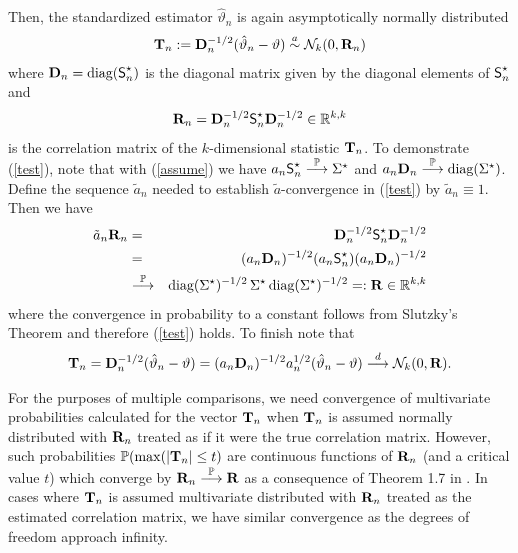 \documentclass[12pt,a4paper]{article}
\begin{document}
Then, the standardized estimator $\hat{\vartheta}_n$ is again asymptotically normally
distributed
\begin{eqnarray} \label{test}
\T_n := %
\D_n^{-1/2} (\hat{\vartheta}_n - \vartheta) \an \N_k(0, \Cor_n)
\end{eqnarray}
where $\mathbf{D}_n = \text{diag}(\textsf{S}^\star_n)$ is the diagonal matrix given by the diagonal elements of
$\textsf{S}^\star_n$ and 
\begin{eqnarray*}
\mathbf{R}_n = \mathbf{D}_n^{-1/2} \textsf{S}^\star_n \mathbf{D}_n^{-1/2} \in \mathbb{R}^{k,k} 
\end{eqnarray*}
is the correlation matrix of the $k$-dimensional statistic 
$\mathbf{T}_n$. 
To demonstrate (\ref{test}), note that 
with (\ref{assume}) we have $a_n \textsf{S}^\star_n \stackrel{\mathbb{P}}{\longrightarrow} \Sigma^\star$ 
and $a_n \mathbf{D}_n \stackrel{\mathbb{P}}{\longrightarrow} \text{diag}(\Sigma^\star)$. 
Define the sequence $\tilde{a}_n$ needed to
establish $\tilde{a}$-convergence in (\ref{test}) by $\tilde{a}_n \equiv
1$. Then we have
\begin{eqnarray*}
\tilde{a}_n \mathbf{R}_n  & = & \mathbf{D}_n^{-1/2} \textsf{S}^\star_n \mathbf{D}_n^{-1/2} \\
& = & (a_n \mathbf{D}_n)^{-1/2} (a_n \textsf{S}^\star_n) (a_n \mathbf{D}_n)^{-1/2} \\
& \stackrel{\mathbb{P}}{\longrightarrow} & \text{diag}(\Sigma^\star)^{-1/2} \, \Sigma^\star \, \text{diag}(\Sigma^\star)^{-1/2} 
=: \mathbf{R} \in \mathbb{R}^{k,k}
\end{eqnarray*}
where the convergence in probability to a constant follows from
Slutzky's Theorem \citep[Theorem 1.5.4,][]{Serfling1980} and 
therefore (\ref{test}) holds. To finish note that
\begin{eqnarray*}
\mathbf{T}_n = \mathbf{D}_n^{-1/2} (\hat{\vartheta}_n - \vartheta) = (a_n \mathbf{D}_n)^{-1/2}
a_n^{1/2} (\hat{\vartheta}_n - \vartheta) \stackrel{d}{\longrightarrow} \mathcal{N}_k(0, \mathbf{R}).
\end{eqnarray*}


For the purposes of multiple comparisons, we need convergence of
multivariate probabilities calculated for the vector $\mathbf{T}_n$ when $\mathbf{T}_n$ is
assumed normally distributed with $\mathbf{R}_n$ treated as if it were the true
correlation matrix.
However, such probabilities $\mathbb{P}(\max(|\mathbf{T}_n| \le t)$
are continuous functions of $\mathbf{R}_n$ (and a critical value $t$) which converge by
$\mathbf{R}_n \stackrel{\mathbb{P}}{\longrightarrow} \mathbf{R}$ as a consequence of Theorem 1.7 in \cite{Serfling1980}.
In cases where $\mathbf{T}_n$ is assumed
multivariate distributed with $\mathbf{R}_n$ treated as the estimated correlation
matrix, we have similar convergence as the degrees of freedom approach
infinity.
\end{document}

